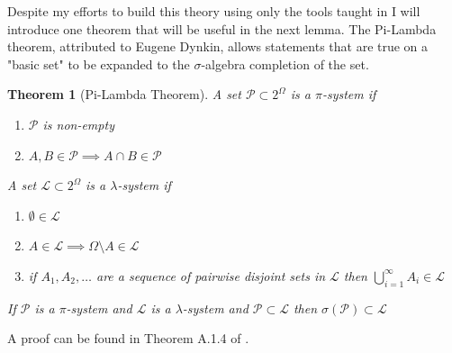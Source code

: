 \documentclass[11pt]{amsart}
\newtheorem{theorem}{Theorem}[section]      %
\theoremstyle{definition}                  %
\theoremstyle{remark}                      %
\begin{document}
Despite my efforts to build this theory using only the tools taught in \citep{Tao2011Measure} I will introduce one theorem that will be useful in the next lemma.
The Pi-Lambda theorem, attributed to Eugene Dynkin, allows statements that are true on a "basic set" to be expanded to the $\sigma$-algebra completion of the set.
\begin{theorem}[Pi-Lambda Theorem]\label{thm:pilambda}
    A set $\mathcal{P} \subset 2^{\Omega}$ is a $\pi$-system if
    \begin{enumerate}
        \item $\mathcal{P}$ is non-empty
        \item $A, B \in \mathcal{P} \implies A \cap B \in \mathcal{P}$
    \end{enumerate}
    A set $\mathcal{L} \subset 2^{\Omega}$ is a $\lambda$-system if
    \begin{enumerate}
        \item  $\emptyset \in \mathcal{L}$
        \item $A \in \mathcal{L} \implies \Omega \setminus A \in \mathcal{L}$
        \item if $A_1,A_2,\dots$ are a sequence of pairwise disjoint sets in $\mathcal{L}$ then
            $\bigcup_{i=1}^{\infty}A_i \in \mathcal{L}$
    \end{enumerate}
    If $\mathcal{P}$ is a  $\pi$-system and $\mathcal{L}$ is a  $\lambda$-system and $\mathcal{P} \subset \mathcal{L}$ then $\sigma(\mathcal{P}) \subset \mathcal{L}$
\end{theorem}
A proof can be found in Theorem A.1.4 of \citet{Durrett2019}.
\end{document}
